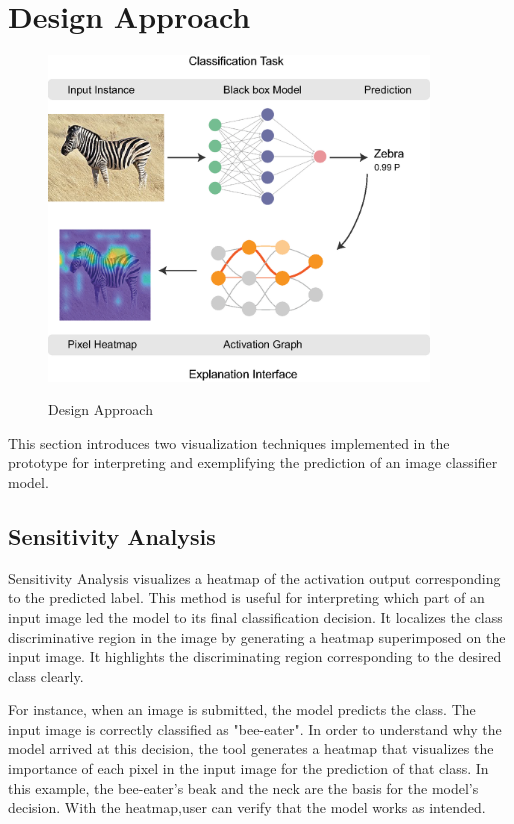 \section{Design Approach}

\begin{figure}[htbp]
\centering\textbf{}
\includegraphics[width=0.9\textwidth]{images/method-schema-copy.eps}
\caption{Design Approach}
\label{fig:design-approach}
\end{figure}

This section introduces two visualization techniques implemented in the prototype for interpreting and exemplifying the prediction of an image classifier model.

\subsection{Sensitivity Analysis}

Sensitivity Analysis visualizes a heatmap of the activation output corresponding to the predicted label. This method is useful for interpreting which part of an input image led the model to its final classification decision. It localizes the class discriminative region in the image by generating a heatmap superimposed on the input image. It highlights the discriminating region corresponding to the desired class clearly.

For instance, when an image is submitted, the model predicts the class. The input image is correctly classified as "bee-eater". In order to understand why the model arrived at this decision, the tool generates a heatmap that visualizes the importance of each pixel in the input image for the prediction of that class. In this example, the bee-eater's beak and the neck are the basis for the model's decision. With the heatmap,user can verify that the model works as intended.

